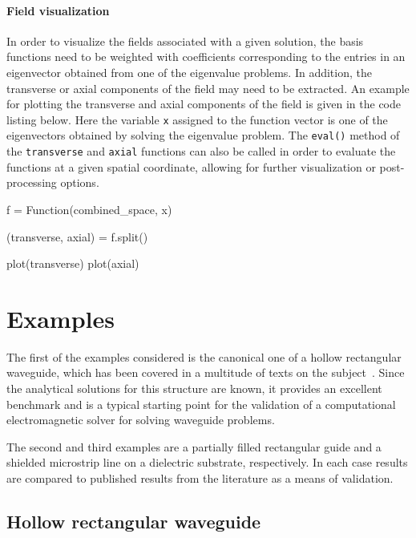 \paragraph{Field visualization}
In order to visualize the fields associated with a given solution, the basis functions need to be weighted with coefficients corresponding to the entries in an eigenvector obtained from one of the eigenvalue problems. In addition, the transverse or axial components of the field may need to be extracted. An example for plotting the transverse and axial components of the field is given in the code listing below.  Here the variable {\tt x} assigned to the function vector is one of the eigenvectors obtained by solving the eigenvalue problem. The {\tt eval()} method of the {\tt transverse} and {\tt axial} functions can also be called in order to evaluate the functions at a given spatial coordinate, allowing for further visualization or post-processing options.
\begin{python}
f = Function(combined_space, x)

(transverse, axial) = f.split()

plot(transverse)
plot(axial)
\end{python}

\section{Examples}
\label{lezar:sec:Examples}
The first of the examples considered is the canonical one of a hollow rectangular waveguide, which has been covered in a multitude of texts on the subject~\citep{Davidson2011, Jin2002, PelosiCoccioliSelleri1998, Pozar2005}. Since the analytical solutions for this structure are known, it provides an excellent benchmark and is a typical starting point for the validation of a computational electromagnetic solver for solving waveguide problems.

The second and third examples are a partially filled rectangular guide and a shielded microstrip line on a dielectric substrate, respectively. In each case results are compared to published results from the literature as a means of validation.

\subsection{Hollow rectangular waveguide}

